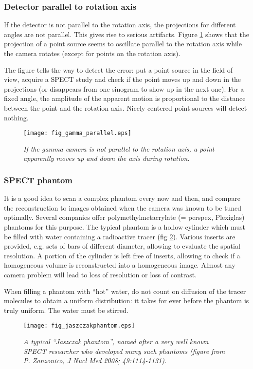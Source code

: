 \subsubsection{Detector parallel to rotation axis}
If the detector is not parallel to the rotation axis, the projections
for different angles are not parallel. This gives rise to serious
artifacts. Figure \ref{fig:gamma_parallel} shows that the projection
of a point source seems to oscillate parallel to the rotation axis
while the camera rotates (except for points on the rotation axis).

The figure tells the way to detect the error: put a point source in the field
of view, acquire a SPECT study and check if the point moves up and down in the
projections (or disappears from one sinogram to show up in the next one). For
a fixed angle, the amplitude of the apparent motion is proportional to the
distance between the point and the rotation axis. Nicely centered point
sources will detect nothing.

\begin{figure}[tb]
\centering
\texttt{[image: fig\_gamma\_parallel.eps]}
\caption{\label{fig:gamma_parallel} \emph{If the gamma camera is not parallel
to the rotation axis, a point apparently moves up and down the axis during
rotation.}}
\end{figure}


\subsubsection{SPECT phantom}
It is a good idea to scan a complex phantom every now and then, and
compare the reconstruction to images obtained when the camera was
known to be tuned optimally. Several companies offer
polymethylmetacrylate (= perspex, Plexiglas) phantoms for this
purpose. The typical phantom is a hollow cylinder which must be filled
with water containing a radioactive tracer (fig
\ref{fig:jaszczak}). Various inserts are provided, e.g. sets of bars
of different diameter, allowing to evaluate the spatial resolution. A
portion of the cylinder is left free of inserts, allowing to check if
a homogeneous volume is reconstructed into a homogeneous image. Almost
any camera problem will lead to loss of resolution or loss of
contrast.

When filling a phantom with ``hot'' water, do not count on diffusion of the
tracer molecules to obtain a uniform distribution: it takes for ever before the
phantom is truly uniform. The water must be stirred.
\begin{figure}[tb]
\centering
\texttt{[image: fig\_jaszczakphantom.eps]}
\caption{\label{fig:jaszczak} \emph{A typical ``Jaszczak phantom'',
    named after a very well known SPECT researcher who developed many
    such phantoms (figure from P. Zanzonico, {\em J Nucl Med} 2008;
    49:1114-1131).}}
\end{figure}

